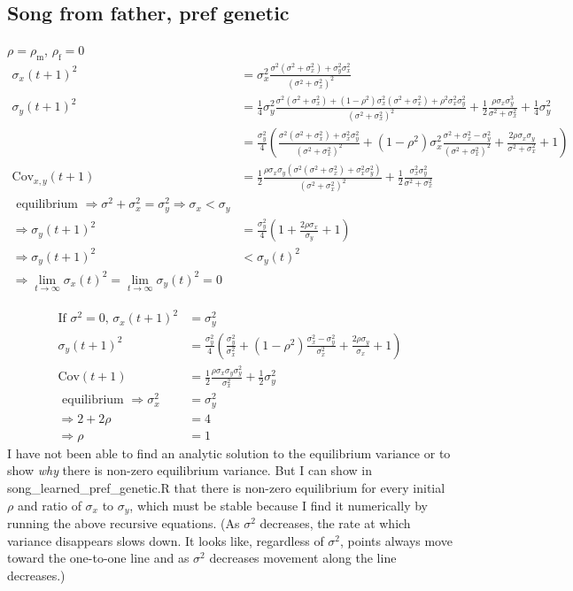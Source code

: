 \documentclass{article}
\newcommand{\x}[1]{\text{#1}}
\newcommand{\Cov}{\text{Cov}}
\begin{document}
\subsection{Song from father, pref genetic }
$\rho = \rho_\x{m}$, $\rho_\x{f}=0$
\begin{align*}
\sigma_{x}(t+1)^2&=\sigma_{x}^2\frac{\sigma^2(\sigma^2+\sigma_{x}^2)+\sigma_y^2\sigma_x^2}{(\sigma^2+\sigma_x^2)^2}
\\ \sigma_y(t+1)^2&=\frac{1}{4}\sigma_y^2\frac{\sigma^2(\sigma^2+\sigma_x^2)+(1-\rho^2)\sigma_x^2(\sigma^2+\sigma_x^2)+\rho^2\sigma_x^2\sigma_y^2}{(\sigma^2+\sigma_x^2)^2}+\frac{1}{2}\frac{\rho\sigma_x\sigma_y^3}{\sigma^2+\sigma_x^2}+\frac{1}{4}\sigma_y^2 
\\ &=\frac{\sigma_y^2}{4}\left(\frac{\sigma^2(\sigma^2+\sigma_x^2)+\sigma_x^2\sigma_y^2}{(\sigma^2+\sigma_x^2)^2}+(1-\rho^2)\sigma_x^2\frac{\sigma^2+\sigma_x^2-\sigma_y^2}{(\sigma^2+\sigma_x^2)^2}+\frac{2\rho\sigma_x\sigma_y}{\sigma^2+\sigma_x^2}+1\right)
\\ \Cov_{x,y}(t+1)&=\frac{1}{2}\frac{\rho\sigma_x\sigma_y\left(\sigma^2(\sigma^2+\sigma_x^2)+\sigma_x^2\sigma_y^2\right)}{(\sigma^2+\sigma_x^2)^2}+\frac{1}{2}\frac{\sigma_x^2\sigma_y^2}{\sigma^2+\sigma_x^2}
\\\text{ equilibrium } \Rightarrow \sigma^2+\sigma_x^2=\sigma_y^2 \Rightarrow \sigma_x<\sigma_y
\\ \Rightarrow \sigma_y(t+1)^2&=\frac{\sigma_y^2}{4}\left(1+\frac{2\rho\sigma_x}{\sigma_y}+1\right)
\\ \Rightarrow \sigma_y(t+1)^2&<\sigma_y(t)^2
\\ \Rightarrow \lim_{t\to\infty}\sigma_x(t)^2=\lim_{t\to\infty}\sigma_y(t)^2=0
\end{align*}

\begin{align*}
\text{If $\sigma^2=0$, } \sigma_x(t+1)^2&=\sigma_y^2
\\ \sigma_y(t+1)^2&=\frac{\sigma_y^2}{4}\left(\frac{\sigma_y^2}{\sigma_x^2}+(1-\rho^2)\frac{\sigma_x^2-\sigma_y^2}{\sigma_x^2}+\frac{2\rho\sigma_y}{\sigma_x}+1\right)
\\\Cov(t+1)&=\frac{1}{2}\frac{\rho\sigma_x\sigma_y\sigma_y^2}{\sigma_x^2}+\frac{1}{2}\sigma_y^2
\\ \text{ equilibrium } \Rightarrow \sigma_x^2&=\sigma_y^2
\\ \Rightarrow 2+2\rho&=4
\\ \Rightarrow \rho&=1
\end{align*}
I have not been able to find an analytic solution to the equilibrium variance or to show \emph{why} there is non-zero equilibrium variance. But I can show in song\_learned\_pref\_genetic.R that there is non-zero equilibrium for every initial $\rho$ and ratio of $\sigma_{x}$ to $\sigma_y$, which must be stable because I find it numerically by running the above recursive equations. (As $\sigma^2$ decreases, the rate at which variance disappears slows down. It looks like, regardless of $\sigma^2$, points always move toward the one-to-one line and as $\sigma^2$ decreases movement along the line decreases.)
\end{document}
